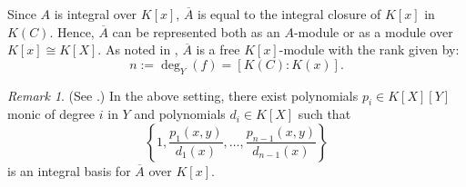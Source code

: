 \documentclass[a4paper,11pt]{amsart}%
\theoremstyle{definition}
\theoremstyle{plain}
\theoremstyle{remark}
\newtheorem{remark}[defn]{Remark}
\begin{document}
Since \(A\) is integral over \(K[x]\), \(\overline{A}\) is equal to the integral closure of \(K[x]\) in \(K(C)\). Hence, \(\overline{A}\) can be represented both as an $A$-module or as a module over $K[x] \cong K[X]$. As noted in \cite[Remark 2]{intbas}, \(\overline{A}\) is a free \(K[x]\)-module with the rank given by:
\[
n:=\deg_{Y}(f)=[K(C):K(x)].
\]

\begin{remark} (See \cite[Remark 4]{intbas}.)
\label{rem:spec-int-basis}
In the above setting, there exist
polynomials $p_{i} \in K[X][Y]$ monic of degree $i$ in $Y$ and polynomials
$d_i\in K[X]$ such that
\[
\left\{1,\frac{p_{1}(x,y)}{d_1(x)},\dots,\frac{p_{n-1}(x,y)}{d_{n-1}(x)}\right\}
\]
is an integral basis %
for $\overline{A}$ over $K[x]$.

\end{remark}




%
%
\end{document}

